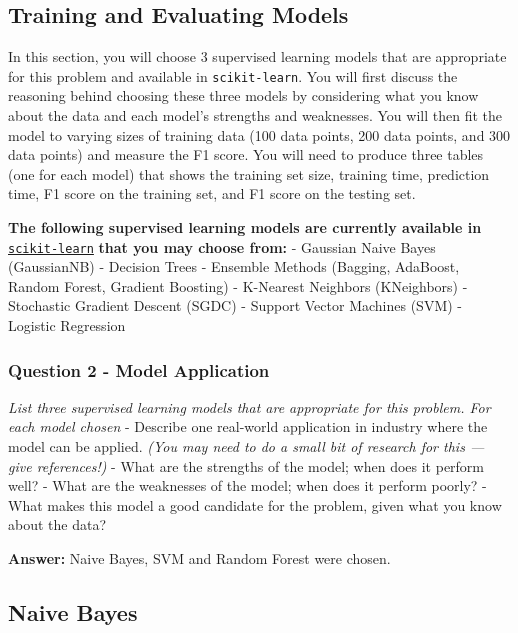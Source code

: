 \documentclass[11pt]{article}
\begin{document}
    \subsection{Training and Evaluating
Models}\label{training-and-evaluating-models}

In this section, you will choose 3 supervised learning models that are
appropriate for this problem and available in \texttt{scikit-learn}. You
will first discuss the reasoning behind choosing these three models by
considering what you know about the data and each model's strengths and
weaknesses. You will then fit the model to varying sizes of training
data (100 data points, 200 data points, and 300 data points) and measure
the F1 score. You will need to produce three tables (one for each model)
that shows the training set size, training time, prediction time, F1
score on the training set, and F1 score on the testing set.

\textbf{The following supervised learning models are currently available
in}
\href{http://scikit-learn.org/stable/supervised_learning.html}{\texttt{scikit-learn}}
\textbf{that you may choose from:} - Gaussian Naive Bayes (GaussianNB) -
Decision Trees - Ensemble Methods (Bagging, AdaBoost, Random Forest,
Gradient Boosting) - K-Nearest Neighbors (KNeighbors) - Stochastic
Gradient Descent (SGDC) - Support Vector Machines (SVM) - Logistic
Regression

    \subsubsection{Question 2 - Model
Application}\label{question-2---model-application}

\emph{List three supervised learning models that are appropriate for
this problem. For each model chosen} - Describe one real-world
application in industry where the model can be applied. \emph{(You may
need to do a small bit of research for this --- give references!)} -
What are the strengths of the model; when does it perform well? - What
are the weaknesses of the model; when does it perform poorly? - What
makes this model a good candidate for the problem, given what you know
about the data?

    \textbf{Answer: } Naive Bayes, SVM and Random Forest were chosen.

\subsection{Naive Bayes}\label{naive-bayes}
\end{document}
